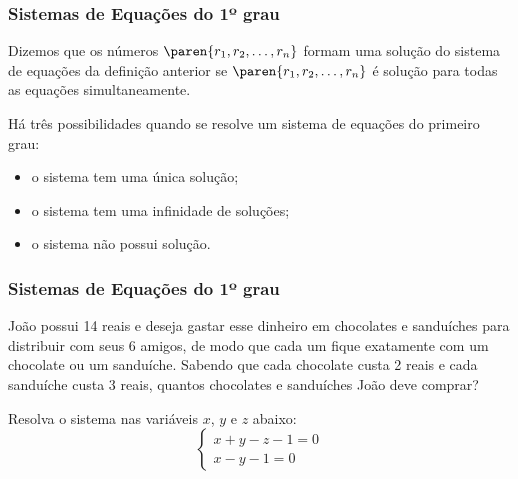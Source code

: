     

    \begin{frame}
        \frametitle{Sistemas de Equações do 1º grau} 
    
        Dizemos que os números $\paren{r_1, r_2, \dots , r_n}$ formam uma solução do sistema de equações da definição anterior se  $\paren{r_1, r_2, \dots , r_n}$ é solução para todas as equações simultaneamente.

        Há três possibilidades quando se resolve um sistema de equações do primeiro grau:
        \begin{itemize}
            \item o sistema tem uma única solução;
            \item o sistema tem uma infinidade de soluções;
            \item o sistema não possui solução.
        \end{itemize}
    
    
    \end{frame}
        
        
        


\begin{frame}
    \frametitle{Sistemas de Equações do 1º grau} 
        
    \begin{exemplo}
        João possui 14 reais e deseja gastar esse dinheiro em chocolates e sanduíches para distribuir com seus 6 amigos, de modo que cada um fique exatamente com um chocolate ou um sanduíche. Sabendo que cada chocolate custa 2 reais e cada sanduíche custa 3 reais, quantos chocolates e sanduíches João deve comprar?
    \end{exemplo}\pause

    \begin{exemplo}
        Resolva o sistema nas variáveis $x$, $y$ e $z$ abaixo:
        $$\left\{
        \begin{array}{ll}
        x+y-z-1 = 0 \\
        x-y-1 = 0 
        \end{array} \right.$$
    \end{exemplo}
        
        
\end{frame}
            
